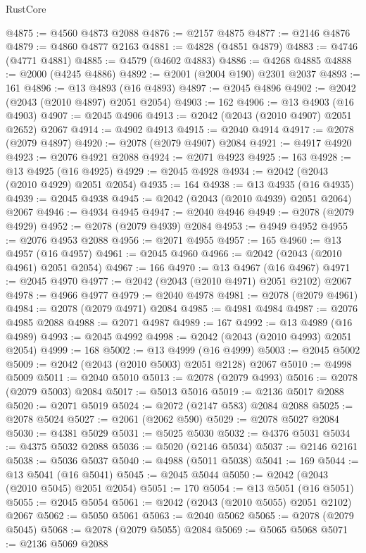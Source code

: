 \begin{lexlean}{RustCore}
\begin{coremodule}
@4875 := @4560 @4873 @2088
@4876 := @2157 @4875
@4877 := @2146 @4876
@4879 := @4860 @4877 @2163
@4881 := @4828 (@4851 @4879)
@4883 := @4746 (@4771 @4881)
@4885 := @4579 (@4602 @4883)
@4886 := @4268 @4885
@4888 := @2000 (@4245 @4886)
@4892 := @2001 (@2004 @190) @2301 @2037
@4893 := 161
@4896 := @13 @4893 (@16 @4893)
@4897 := @2045 @4896
@4902 := @2042 (@2043 (@2010 @4897) @2051 @2054)
@4903 := 162
@4906 := @13 @4903 (@16 @4903)
@4907 := @2045 @4906
@4913 := @2042 (@2043 (@2010 @4907) @2051 @2652) @2067
@4914 := @4902 @4913
@4915 := @2040 @4914
@4917 := @2078 (@2079 @4897)
@4920 := @2078 (@2079 @4907) @2084
@4921 := @4917 @4920
@4923 := @2076 @4921 @2088
@4924 := @2071 @4923
@4925 := 163
@4928 := @13 @4925 (@16 @4925)
@4929 := @2045 @4928
@4934 := @2042 (@2043 (@2010 @4929) @2051 @2054)
@4935 := 164
@4938 := @13 @4935 (@16 @4935)
@4939 := @2045 @4938
@4945 := @2042 (@2043 (@2010 @4939) @2051 @2064) @2067
@4946 := @4934 @4945
@4947 := @2040 @4946
@4949 := @2078 (@2079 @4929)
@4952 := @2078 (@2079 @4939) @2084
@4953 := @4949 @4952
@4955 := @2076 @4953 @2088
@4956 := @2071 @4955
@4957 := 165
@4960 := @13 @4957 (@16 @4957)
@4961 := @2045 @4960
@4966 := @2042 (@2043 (@2010 @4961) @2051 @2054)
@4967 := 166
@4970 := @13 @4967 (@16 @4967)
@4971 := @2045 @4970
@4977 := @2042 (@2043 (@2010 @4971) @2051 @2102) @2067
@4978 := @4966 @4977
@4979 := @2040 @4978
@4981 := @2078 (@2079 @4961)
@4984 := @2078 (@2079 @4971) @2084
@4985 := @4981 @4984
@4987 := @2076 @4985 @2088
@4988 := @2071 @4987
@4989 := 167
@4992 := @13 @4989 (@16 @4989)
@4993 := @2045 @4992
@4998 := @2042 (@2043 (@2010 @4993) @2051 @2054)
@4999 := 168
@5002 := @13 @4999 (@16 @4999)
@5003 := @2045 @5002
@5009 := @2042 (@2043 (@2010 @5003) @2051 @2128) @2067
@5010 := @4998 @5009
@5011 := @2040 @5010
@5013 := @2078 (@2079 @4993)
@5016 := @2078 (@2079 @5003) @2084
@5017 := @5013 @5016
@5019 := @2136 @5017 @2088
@5020 := @2071 @5019
@5024 := @2072 (@2147 @583) @2084 @2088
@5025 := @2078 @5024
@5027 := @2061 (@2062 @590)
@5029 := @2078 @5027 @2084
@5030 := @4381 @5029
@5031 := @5025 @5030
@5032 := @4376 @5031
@5034 := @4375 @5032 @2088
@5036 := @5020 (@2146 @5034)
@5037 := @2146 @2161
@5038 := @5036 @5037
@5040 := @4988 (@5011 @5038)
@5041 := 169
@5044 := @13 @5041 (@16 @5041)
@5045 := @2045 @5044
@5050 := @2042 (@2043 (@2010 @5045) @2051 @2054)
@5051 := 170
@5054 := @13 @5051 (@16 @5051)
@5055 := @2045 @5054
@5061 := @2042 (@2043 (@2010 @5055) @2051 @2102) @2067
@5062 := @5050 @5061
@5063 := @2040 @5062
@5065 := @2078 (@2079 @5045)
@5068 := @2078 (@2079 @5055) @2084
@5069 := @5065 @5068
@5071 := @2136 @5069 @2088

\end{coremodule}
\end{lexlean}
